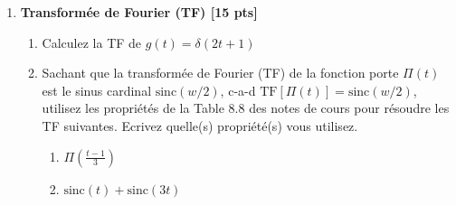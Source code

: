 \documentclass{article}
\begin{document}
\begin{enumerate}
\item {\bf Transformée de Fourier (TF) [15 pts]}
  \begin{enumerate}
    \vspace{0.5cm}

    
  
  \item Calculez la TF de $g(t) = \delta(2t + 1)$
  
    \vspace{1cm}


    \vspace{1cm}

  \item Sachant que la transformée de Fourier (TF) de la fonction
    porte $\Pi(t)$ est le sinus cardinal $\textrm{sinc}(w / 2)$, c-a-d
    $\textrm{TF}[\Pi(t)] = \textrm{sinc}(w/2)$, 
    utilisez les propriétés de la Table 8.8 des notes de cours
    pour résoudre les TF suivantes. 
    Ecrivez quelle(s) propriété(s) vous utilisez.
   \vspace{0.5cm}
    \begin{enumerate}
    \item $\Pi( \frac{t-1}{3} )$
   \vspace{0.5cm}
    \item  $\textrm{sinc}(t) + \textrm{sinc}(3t)$
    \vspace{1cm}
    \end{enumerate}

    \vspace{1cm}

\end{enumerate}


\end{enumerate}
\end{document}
